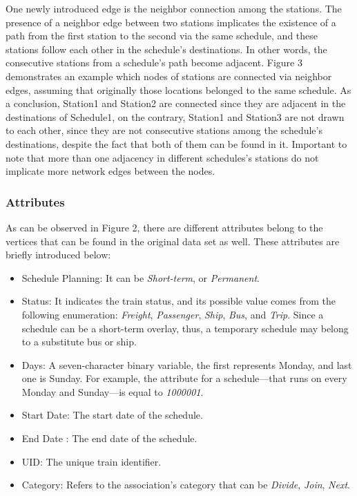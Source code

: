 One newly introduced edge is the \textsf{neighbor} connection among the stations. The presence of a \textsf{neighbor} edge between two stations implicates the existence of a path from the first station to the second via the same schedule, and these stations follow each other in the schedule's destinations. In other words, the consecutive stations from a schedule's path become adjacent. Figure 3 demonstrates an example which nodes of stations are connected via \textsf{neighbor} edges, assuming that originally those locations belonged to the same schedule. As a conclusion, \textsf{Station1} and \textsf{Station2} are connected since they are adjacent in the destinations of \textsf{Schedule1}, on the contrary, \textsf{Station1} and \textsf{Station3} are not drawn to each other, since they are not consecutive stations among the schedule's destinations, despite the fact that both of them can be found in it. %
Important to note that more than one adjacency in different schedules's stations do not implicate more \textsf{network} edges between the nodes.

\subsubsection{Attributes}

As can be observed in Figure 2, %
there are different attributes belong to the vertices that can be found in the original data set as well. These attributes are briefly introduced below:
\begin{itemize}
	\item{\textsf{Schedule Planning}}: It can be \textit{Short-term}, or \textit{Permanent}.
	\item{\textsf{Status}}: It indicates the train status, and its possible value comes from the following enumeration: \textit{Freight}, \textit{Passenger}, \textit{Ship}, \textit{Bus}, and \textit{Trip}. Since a schedule can be a short-term overlay, thus, a temporary schedule may belong to a substitute bus or ship.
	\item{\textsf{Days}}: A seven-character binary variable, the first represents Monday, and last one is Sunday. For example, the attribute for a schedule---that runs on every Monday and Sunday---is equal to \textit{1000001}.
	\item{\textsf{Start Date}}: The start date of the schedule.
	\item{\textsf{End Date}} : The end date of the schedule.
	\item{\textsf{UID}}: The unique train identifier.
	\item{\textsf{Category}}: Refers to the association's category that can be \textit{Divide}, \textit{Join}, \textit{Next}.
\end{itemize}


